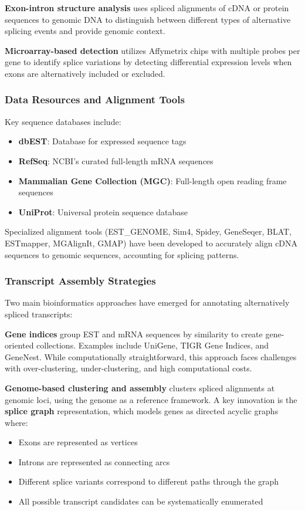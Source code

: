 \documentclass[12pt,a4paper]{article}
\begin{document}
\textbf{Exon-intron structure analysis} uses spliced alignments of cDNA or protein sequences to genomic DNA to distinguish between different types of alternative splicing events and provide genomic context.

\textbf{Microarray-based detection} utilizes Affymetrix chips with multiple probes per gene to identify splice variations by detecting differential expression levels when exons are alternatively included or excluded.

\subsubsection{Data Resources and Alignment Tools}

Key sequence databases include:
\begin{itemize}
    \item \textbf{dbEST}: Database for expressed sequence tags
    \item \textbf{RefSeq}: NCBI's curated full-length mRNA sequences
    \item \textbf{Mammalian Gene Collection (MGC)}: Full-length open reading frame sequences
    \item \textbf{UniProt}: Universal protein sequence database
\end{itemize}

Specialized alignment tools (EST\_GENOME, Sim4, Spidey, GeneSeqer, BLAT, ESTmapper, MGAlignIt, GMAP) have been developed to accurately align cDNA sequences to genomic sequences, accounting for splicing patterns.

\subsubsection{Transcript Assembly Strategies}

Two main bioinformatics approaches have emerged for annotating alternatively spliced transcripts:

\textbf{Gene indices} group EST and mRNA sequences by similarity to create gene-oriented collections. Examples include UniGene, TIGR Gene Indices, and GeneNest. While computationally straightforward, this approach faces challenges with over-clustering, under-clustering, and high computational costs.

\textbf{Genome-based clustering and assembly} clusters spliced alignments at genomic loci, using the genome as a reference framework. A key innovation is the \textbf{splice graph} representation, which models genes as directed acyclic graphs where:
\begin{itemize}
    \item Exons are represented as vertices
    \item Introns are represented as connecting arcs
    \item Different splice variants correspond to different paths through the graph
    \item All possible transcript candidates can be systematically enumerated
\end{itemize}
\end{document}
